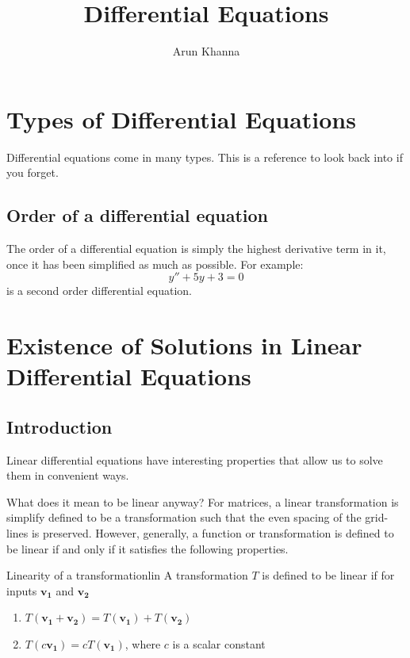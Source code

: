 \documentclass{report}
\title{Differential Equations}
\author{Arun Khanna}
\date{}
\begin{document}
\maketitle
\tableofcontents

\chapter{Types of Differential Equations}
Differential equations come in many types. This is a reference to look back into if you forget.
\section{Order of a differential equation}
The order of a differential equation is simply the highest derivative term in it, once it has been simplified as much as possible. For example:
$$y'' + 5y + 3 = 0$$
is a second order differential equation.

\section{}



\chapter{Existence of Solutions in Linear Differential Equations}
\section{Introduction}
Linear differential equations have interesting properties that allow us to solve them in convenient ways.

What does it mean to be linear anyway? For matrices, a linear transformation is simplify defined to be a transformation such that the even spacing of the grid-lines is preserved. However, generally, a function or transformation is defined to be linear if and only if it satisfies the following properties.

\begin{mytheo}{Linearity of a transformation}{lin}
    A transformation $T$ is defined to be linear if for inputs $\mathbf{v_1}$ and $\mathbf{v_2}$
    \begin{enumerate}
        \item $T(\mathbf{v_1}+\mathbf{v_2}) = T(\mathbf{v_1}) + T(\mathbf{v_2})$
        \item $T(c\mathbf{v_1}) = cT(\mathbf{v_1})$, where $c$ is a scalar constant
   \end{enumerate}
\end{mytheo}
\end{document}
